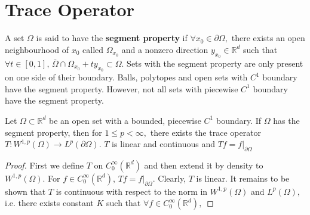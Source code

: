 \section{Trace Operator}
A set $\Omega$ is said to have the \textbf{segment property} if $\forall x_0\in\partial\Omega,$ there exists an open neighbourhood of $x_0$ called $\Omega_{x_0}$ and a nonzero direction $y_{x_0}\in\mathbb{R}^d$ such that $\forall t\in[0,1],\,\overline{\Omega}\cap\Omega_{x_0}+ty_{x_0}\subset\Omega.$ Sets with the segment property are only present on one side of their boundary. Balls, polytopes and open sets with $C^1$ boundary have the segment property. However, not all sets with piecewise $C^1$ boundary have the segment property.
\begin{theorem}
    Let $\Omega\subset\mathbb{R}^d$  be an open set with a bounded, piecewise $C^1$ boundary. If $\Omega$ has the segment property, then for $1\leq p<\infty,$ there exists the trace operator $T:W^{1,p}(\Omega)\rightarrow L^p(\partial\Omega).$ $T$ is linear and continuous and $Tf=f|_{\partial\Omega}$
\end{theorem}
\begin{proof}
    First we define $T$ on $C_0^\infty(\mathbb{R}^d)$ and then extend it by density to $W^{1,p}(\Omega).$ For $f\in C^\infty_0(\mathbb{R}^d),\,Tf=f|_{\partial\Omega}.$ Clearly, $T$ is linear. It remains to be shown that $T$ is continuous with respect to the norm in $W^{1,p}(\Omega)$ and $L^p(\Omega),$ i.e. there exists constant $K$ such that $\forall f\in C^\infty_0(\mathbb{R}^d),$
\end{proof}

